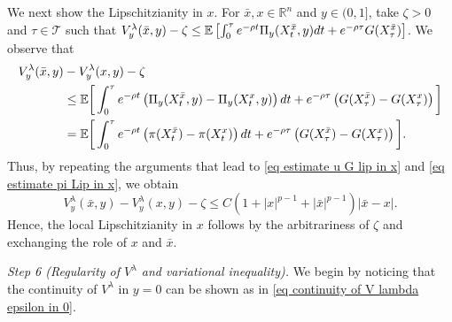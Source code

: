 \documentclass[11pt]{amsart}
\theoremstyle{plain}
\def \dd{{\rm d}}
\numberwithin{equation}{section}
\begin{document}
We next show the Lipschitzianity in $x$.
For $\bar{x}, x \in \mathbb{R}^{n}$ and $y \in (0,1]$, take $\zeta >0$ and $\tau \in \mathcal T$ such that $V^\lambda_y (\bar x, y)  - \zeta 
  \leq \mathbb{E}\left[\int_{0}^{\tau} e ^{-\rho t} \Pi_{y}(X_{t}^{\bar x}, {y}) \dd t + e^{-\rho \tau} G(X^{\bar x}_\tau ) \right]$. 
We observe that
\begin{equation}\label{eq Vy first}
\begin{aligned}
 V^\lambda_y (\bar x, y) & - V^\lambda_y (x, y)-\zeta \\
 & \leq \mathbb{E}\bigg[\int_{0}^{\tau} e^{-\rho {t}} \left(\Pi_{y}(X_{t}^{\bar{x}}, y )-\Pi_{y} (X_{t}^{x}, y )\right) \dd t + e^{-\rho \tau}\left( G(X_\tau^{\bar{x}})-G (X_\tau^{x})\right) \bigg] \\
 & = \mathbb{E}\bigg[\int_{0}^{\tau} e^{-\rho {t}} \left( \pi(X_{t}^{\bar{x}}  )- \pi (X_{t}^{x}  )\right) \dd t + e^{-\rho \tau}\left( G(X_\tau^{\bar{x}})-G (X_\tau^{x})\right) \bigg].
\end{aligned}
\end{equation}
Thus, by repeating the arguments that lead to \eqref{eq estimate u G lip in x} and \eqref{eq estimate pi Lip in x}, we obtain
$$
 V^\lambda_y (\bar x, y) - V^\lambda_y (x, y)-\zeta \leq C  (1 + |x|^{p-1} + |\bar x|^{p-1})  |\bar x - x|.  
$$
Hence, the local Lipschitzianity in $x$ follows by the arbitrariness of $\zeta$ and exchanging the role of $x$ and $\bar x$.

\smallbreak\noindent
\emph{Step 6 (Regularity of $V^\lambda$ and variational inequality).} 
We begin by noticing that the continuity of $V^\lambda$ in $y=0$ can be shown as in \eqref{eq continuity of V lambda epsilon in 0}.
\end{document}
